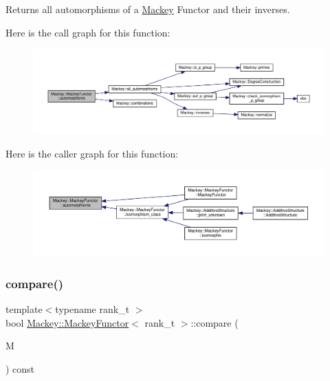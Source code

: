Returns all automorphisms of a \hyperlink{namespaceMackey}{Mackey} Functor and their inverses. 

Here is the call graph for this function\+:\nopagebreak
\begin{figure}[H]
\begin{center}
\leavevmode
\includegraphics[width=350pt]{classMackey_1_1MackeyFunctor_ac7ef9ab9f3a13660a03c35e64dddd66b_cgraph}
\end{center}
\end{figure}
Here is the caller graph for this function\+:\nopagebreak
\begin{figure}[H]
\begin{center}
\leavevmode
\includegraphics[width=350pt]{classMackey_1_1MackeyFunctor_ac7ef9ab9f3a13660a03c35e64dddd66b_icgraph}
\end{center}
\end{figure}
\mbox{\label{classMackey_1_1MackeyFunctor_a001f4a56e79e68ca3fef808e6b0ccca4}} 
\subsubsection{\texorpdfstring{compare()}{compare()}}
{\footnotesize\ttfamily template$<$typename rank\+\_\+t $>$ \\
bool \hyperlink{classMackey_1_1MackeyFunctor}{Mackey\+::\+Mackey\+Functor}$<$ rank\+\_\+t $>$\+::compare (\begin{DoxyParamCaption}\item[{const \hyperlink{classMackey_1_1MackeyFunctor}{Mackey\+Functor}$<$ rank\+\_\+t $>$ \&}]{M }\end{DoxyParamCaption}) const}



